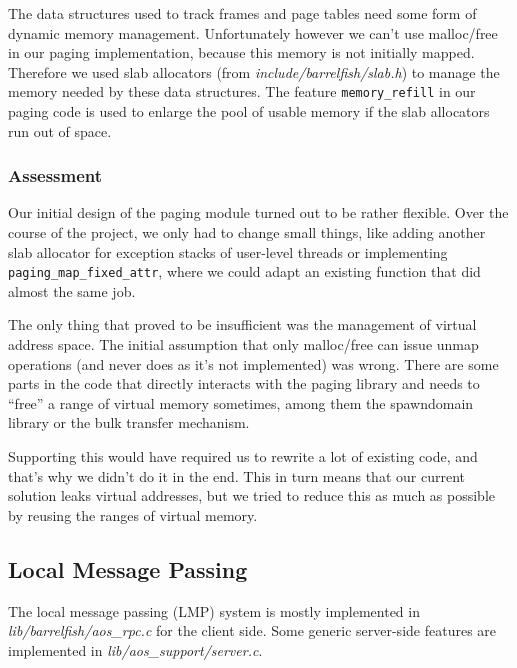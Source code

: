 \documentclass[a4paper,10pt]{article}
\newcommand{\filepath}[1]{\emph{ #1}}
\begin{document}
The data structures used to track frames and page tables need some form of dynamic memory management.
Unfortunately however we can't use malloc/free in our paging implementation, because this memory is not initially mapped.
Therefore we used slab allocators (from \filepath{include/barrelfish/slab.h}) to manage the memory needed by these data structures.
The feature \lstinline!memory_refill! in our paging code is used to enlarge the pool of usable memory if the slab allocators run out of space.

\subsubsection{Assessment}

Our initial design of the paging module turned out to be rather flexible.
Over the course of the project, we only had to change small things, like adding another slab allocator for exception stacks of user-level threads 
or implementing \lstinline!paging_map_fixed_attr!, where we could adapt an existing function that did almost the same job.

The only thing that proved to be insufficient was the management of virtual address space.
The initial assumption that only malloc/free can issue unmap operations (and never does as it's not implemented) was wrong.
There are some parts in the code that directly interacts with the paging library and needs to ``free'' a range of virtual memory sometimes, among them the spawndomain library or the bulk transfer mechanism.

Supporting this would have required us to rewrite a lot of existing code, and that's why we didn't do it in the end.
This in turn means that our current solution leaks virtual addresses, but we tried to reduce this as much as possible by reusing the ranges of virtual memory.

\subsection{Local Message Passing}

The local message passing (LMP) system is mostly implemented in \filepath{lib/barrelfish/aos\_rpc.c} for the client side.
Some generic server-side features are implemented in \filepath{lib/aos\_support/server.c}.
\end{document}
